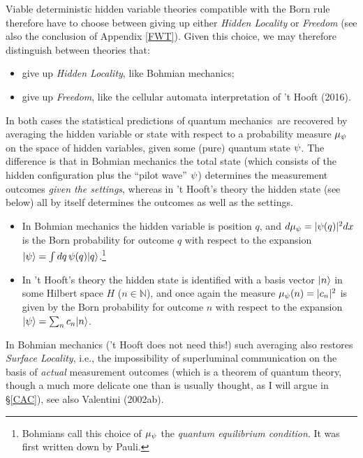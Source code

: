 \documentclass[11pt,a4paper]{article}
\numberwithin{equation}{section}
\newcommand{\qm}{quantum mechanics}
\newcommand{\N}{{\mathbb N}} \newcommand{\R}{{\mathbb R}}
\begin{document}
   Viable deterministic hidden variable theories compatible with the Born rule therefore have to choose between giving up either \emph{Hidden Locality} or  \emph{Freedom} (see also the conclusion of Appendix \ref{FWT}). 
   Given this choice, we may  therefore distinguish between theories that:
  \begin{itemize}
\item  give up  \emph{Hidden Locality}, like Bohmian mechanics;
 \item  give up  \emph{Freedom}, like the cellular automata interpretation of 't Hooft (2016).
 \end{itemize}
 In both cases the statistical predictions of \qm\ are recovered by averaging the hidden variable or state with respect to 
 a probability measure $\mu_{\psi}$ on the space of hidden variables, given some (pure) quantum state $\psi$. The difference is that in Bohmian mechanics the total state (which consists of the hidden configuration plus the ``pilot wave'' $\psi$) determines the measurement outcomes \emph{given the settings}, whereas in  't Hooft's theory 
 the hidden state (see below) all by itself determines the outcomes as well as the settings.
 \begin{itemize}
\item  In Bohmian mechanics the hidden variable is position $q$, and $d\mu_{\psi}=|\psi(q)|^2 dx$ is  the Born probability for outcome $q$ with respect to the expansion $|\psi\rangle=\int dq\, \psi(q) |q\rangle$.\footnote{Bohmians call this choice of $\mu_{\psi}$ the  \emph{quantum equilibrium condition}. It was first written down by Pauli.}
\item In 't Hooft's theory the hidden state  is identified with a basis vector $|n\rangle$ in some Hilbert space $H$ ($n\in\N$), and once again the measure $\mu_{\psi}(n)=|c_{n}|^2$  is given by the Born probability for outcome $n$ with respect to the expansion $|\psi\rangle=\sum_n c_n|n\rangle$. 
\end{itemize}
In Bohmian mechanics ('t Hooft does not need this!) such averaging  also restores \emph{Surface Locality}, i.e.,   the impossibility of  superluminal communication on the basis of \emph{actual} measurement outcomes (which is a theorem of quantum theory, though a much more delicate one than is usually thought, as I will argue in \S\ref{CAC}), see also  Valentini (2002ab).
\end{document}
